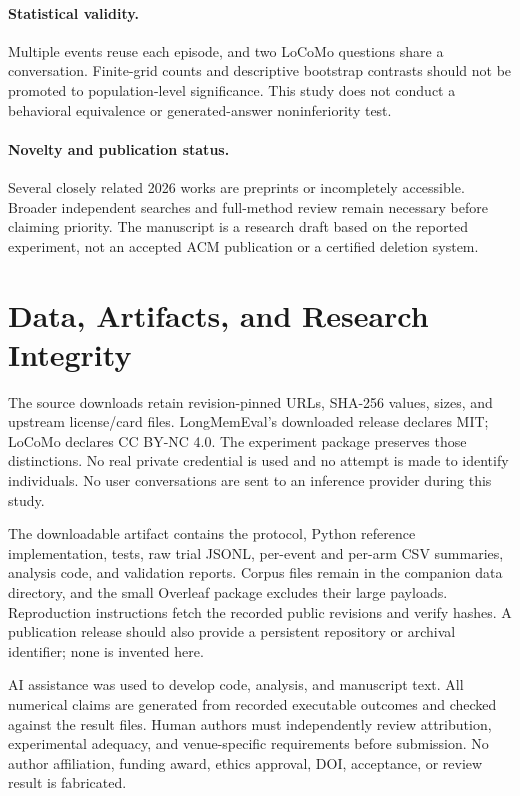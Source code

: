 ﻿\documentclass[sigconf,nonacm]{acmart}
\begin{document}
\paragraph{Statistical validity.} Multiple events reuse each episode, and two LoCoMo questions share a conversation. Finite-grid counts and descriptive bootstrap contrasts should not be promoted to population-level significance. This study does not conduct a behavioral equivalence or generated-answer noninferiority test.

\paragraph{Novelty and publication status.} Several closely related 2026 works are preprints or incompletely accessible. Broader independent searches and full-method review remain necessary before claiming priority. The manuscript is a research draft based on the reported experiment, not an accepted ACM publication or a certified deletion system.

\section{Data, Artifacts, and Research Integrity}
The source downloads retain revision-pinned URLs, SHA-256 values, sizes, and upstream license/card files. LongMemEval's downloaded release declares MIT; LoCoMo declares CC BY-NC 4.0. The experiment package preserves those distinctions. No real private credential is used and no attempt is made to identify individuals. No user conversations are sent to an inference provider during this study.

The downloadable artifact contains the protocol, Python reference implementation, tests, raw trial JSONL, per-event and per-arm CSV summaries, analysis code, and validation reports. Corpus files remain in the companion data directory, and the small Overleaf package excludes their large payloads. Reproduction instructions fetch the recorded public revisions and verify hashes. A publication release should also provide a persistent repository or archival identifier; none is invented here.

AI assistance was used to develop code, analysis, and manuscript text. All numerical claims are generated from recorded executable outcomes and checked against the result files. Human authors must independently review attribution, experimental adequacy, and venue-specific requirements before submission. No author affiliation, funding award, ethics approval, DOI, acceptance, or review result is fabricated.
\end{document}
